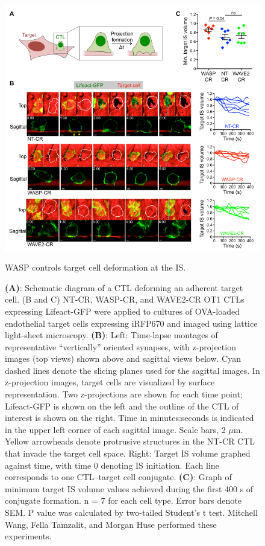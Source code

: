 \begin{figure}[htbp]
	\centering
	\includegraphics[width=\textwidth]{../figures/chapter2/fig7lls.png}
	\caption{WASP controls target cell deformation at the IS.}
	\caption*{\textbf{(A)}: Schematic diagram of a CTL deforming an adherent target cell. (B and C) NT-CR, WASP-CR, and WAVE2-CR OT1 CTLs expressing Lifeact-GFP were applied to cultures of OVA-loaded endothelial target cells expressing iRFP670 and imaged using lattice light-sheet microscopy. \textbf{(B)}: Left: Time-lapse montages of representative “vertically” oriented synapses, with z-projection images (top views) shown above and sagittal views below. Cyan dashed lines denote the slicing planes used for the sagittal images. In z-projection images, target cells are visualized by surface representation. Two z-projections are shown for each time point; Lifeact-GFP is shown on the left and the outline of the CTL of interest is shown on the right. Time in minutes:seconds is indicated in the upper left corner of each sagittal image. Scale bars, 2 $\mu$m. Yellow arrowheads denote protrusive structures in the NT-CR CTL that invade the target cell space. Right: Target IS volume graphed against time, with time 0 denoting IS initiation. Each line corresponds to one CTL–target cell conjugate. \textbf{(C)}: Graph of minimum target IS volume values achieved during the first 400 s of conjugate formation. n = 7 for each cell type. Error bars denote SEM. P value was calculated by two-tailed Student’s t test. Mitchell Wang, Fella Tamzalit, and Morgan Huse performed these experiments.}
	\label{fig:fig7lls}
\end{figure}

